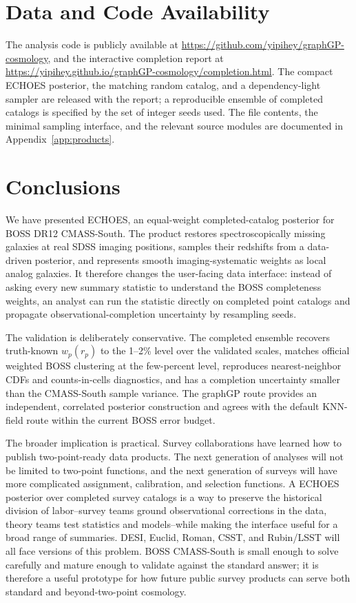 \documentclass[apj]{emulateapj}
\begin{document}
\section{Data and Code Availability}
\label{sec:availability}

The analysis code is publicly available at
\url{https://github.com/yipihey/graphGP-cosmology}, and the interactive
completion report at
\url{https://yipihey.github.io/graphGP-cosmology/completion.html}.  The compact
ECHOES posterior, the matching random catalog, and a dependency-light sampler
are released with the report; a reproducible ensemble of completed catalogs is
specified by the set of integer seeds used.  The file contents, the minimal
sampling interface, and the relevant source modules are documented in
Appendix~\ref{app:products}.

\section{Conclusions}
\label{sec:conclusions}

We have presented \textsc{ECHOES}, an equal-weight completed-catalog posterior
for BOSS DR12 CMASS-South.  The product restores spectroscopically missing
galaxies at real SDSS imaging positions, samples their redshifts from a
data-driven posterior, and represents smooth imaging-systematic weights as
local analog galaxies.  It
therefore changes the user-facing data interface: instead of asking every new
summary statistic to understand the BOSS completeness weights, an analyst can
run the statistic directly on completed point catalogs and propagate
observational-completion uncertainty by resampling seeds.

The validation is deliberately conservative.  The completed ensemble recovers
truth-known $w_p(r_p)$ to the 1--2\% level over the validated scales, matches
official weighted BOSS clustering at the few-percent level, reproduces
nearest-neighbor CDFs and counts-in-cells diagnostics, and has a completion
uncertainty smaller than the CMASS-South sample variance.  The graphGP route
provides an independent, correlated posterior construction and agrees with the
default KNN-field route within the current BOSS error budget.

The broader implication is practical.  Survey collaborations have learned how
to publish two-point-ready data products.  The next generation of analyses will
not be limited to two-point functions, and the next generation of surveys will
have more complicated assignment, calibration, and selection functions.  A
ECHOES posterior over completed survey catalogs is a way to preserve the historical
division of labor--survey teams ground observational corrections in the data,
theory teams test statistics and models--while making the interface useful for a
broad range of summaries.  DESI, Euclid, Roman, CSST, and Rubin/LSST will all face
versions of this problem.  BOSS CMASS-South is small enough to solve carefully
and mature enough to validate against the standard answer; it is therefore a
useful prototype for how future public survey products can serve both standard
and beyond-two-point cosmology.
\end{document}
